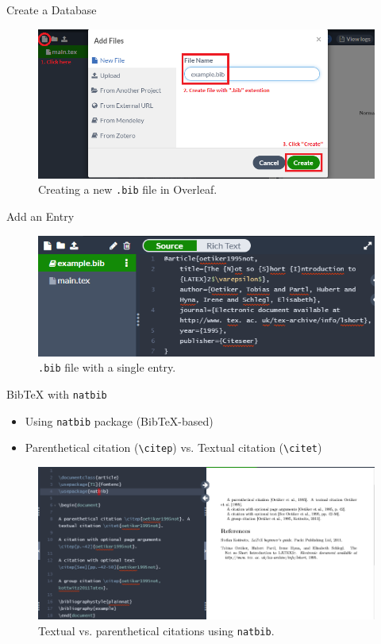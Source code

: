 \documentclass{beamer}
\begin{document}
{  \begin{frame}{Create a Database}
    \begin{figure}
      \includegraphics[width=0.8\linewidth]{day02-03A-database.png}
      \caption{Creating a new \texttt{.bib} file in Overleaf.}
      \label{fig:day02-03A}
    \end{figure}
  \end{frame}

  \begin{frame}{Add an Entry}
    \begin{figure}
      \includegraphics[width=0.8\linewidth]{day02-03B-entry.png}
      \caption{\texttt{.bib} file with a single entry.}
      \label{fig:day02-03B}
    \end{figure}
  \end{frame}

  \begin{frame}{BibTeX with \texttt{natbib}}
    \begin{itemize}
      \item Using \texttt{natbib} package (BibTeX-based)
      \item Parenthetical citation (\texttt{\textbackslash citep}) vs. Textual citation (\texttt{\textbackslash citet})
    \end{itemize}
    \begin{figure}
      \includegraphics[width=0.8\linewidth]{day02-03C-natbib.png}
      \caption{Textual vs. parenthetical citations using \texttt{natbib}.}
      \label{fig:day02-03C}
    \end{figure}
  \end{frame}

}
\end{document}
